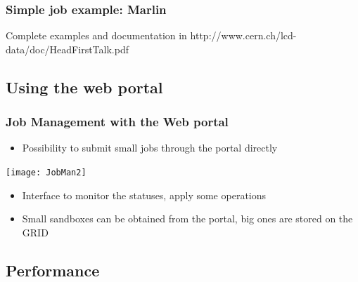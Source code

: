 \documentclass[10pt,table,dvipsnames]{beamer}
\begin{document}
\begin{frame}
  \frametitle{Simple job example: Marlin} 
 
Complete examples and documentation in {\color{blue}http://www.cern.ch/lcd-data/doc/HeadFirstTalk.pdf}
\end{frame}

\subsection{Using the web portal}
\label{sec:web}

\begin{frame}
  \frametitle{Job Management with the Web portal}
  \begin{itemize}
  \item Possibility to {\color{NavyBlue}submit small jobs through the portal} directly
\end{itemize}
\centering
\texttt{[image: JobMan2]}~\\
\begin{itemize}
\item Interface to {\color{NavyBlue}monitor the statuses, apply some operations}
\item {\color{NavyBlue}Small sandboxes} can be obtained {\color{NavyBlue}from the portal}, big ones are
  stored on the GRID
\end{itemize}
\end{frame}

\subsection{Performance}
\label{sec:perfs}
\end{document}
